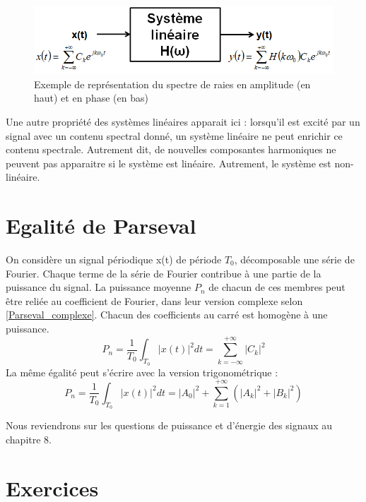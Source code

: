 	 \begin{figure}[h!]
	 	\centering
	 	\includegraphics[scale=0.6]{images/LTI_serie_Fourier.png}
	 	\caption{Exemple de représentation du spectre de raies en amplitude (en haut) et en phase (en bas)}	
	 	\label{Fig:Excitation d'un système linéaire par un signal périodique} 
	 \end{figure}
	 
	Une autre propriété des systèmes linéaires apparait ici : lorsqu'il est excité par un signal avec un contenu spectral donné, un système linéaire ne peut enrichir ce contenu spectrale. Autrement dit, de nouvelles composantes harmoniques ne peuvent pas apparaitre si le système est linéaire. Autrement, le système est non-linéaire.
	 
	 
	 
	
	\section{Egalité de Parseval}
	
	On considère un signal périodique x(t) de période $T_{0}$, décomposable  une série de Fourier. Chaque terme de la série de Fourier contribue à une partie de la puissance du signal. La puissance moyenne $P_{n}$ de chacun de ces membres peut être reliée au coefficient de Fourier, dans leur version complexe selon \ref{Parseval_complexe}. Chacun des coefficients au carré est homogène à une puissance.
	\begin{equation}\label{Parseval_complexe}
	P_{n}=\frac{1}{T_{0}}\int_{T_{0}}|x(t)|^{2}dt=\sum_{k=-\infty}^{+\infty}|C_k|^{2}
	\end{equation}
	La même égalité peut s'écrire avec la version trigonométrique : 
	\begin{equation}\label{Parseval_trigo}
	P_{n}=\frac{1}{T_{0}}\int_{T_{0}}|x(t)|^{2}dt=|A_0|^{2}+\sum_{k=1}^{+\infty}(|A_k|^{2}+|B_k|^{2})
	\end{equation}

	
	Nous reviendrons sur les questions de puissance et d'énergie des signaux au chapitre 8.
	
	
	\section{Exercices}
	
